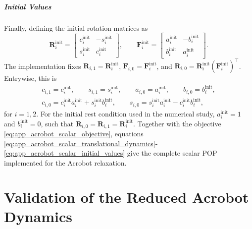 \paragraph{Initial Values}

Finally, defining the initial rotation matrices as
\begin{equation}
\bm{R}_i^{\mathrm{init}}=
\begin{bmatrix}c_i^{\mathrm{init}}&-s_i^{\mathrm{init}}\\
s_i^{\mathrm{init}}&c_i^{\mathrm{init}}\end{bmatrix},
\qquad
\bm{F}_i^{\mathrm{init}}=
\begin{bmatrix}a_i^{\mathrm{init}}&-b_i^{\mathrm{init}}\\
b_i^{\mathrm{init}}&a_i^{\mathrm{init}}\end{bmatrix}.
\label{eq:app_acrobot_initial_matrices}
\end{equation}
The implementation fixes \(\bm{R}_{i,1}=\bm{R}_i^{\mathrm{init}}\),
\(\bm{F}_{i,0}=\bm{F}_i^{\mathrm{init}}\), and
\(\bm{R}_{i,0}=\bm{R}_i^{\mathrm{init}}(\bm{F}_i^{\mathrm{init}})^{\top}\). Entrywise, this is
\begin{subequations}
\label{eq:app_acrobot_scalar_initial_values}
\begin{align}
c_{i,1}=c_i^{\mathrm{init}},\qquad
s_{i,1}=s_i^{\mathrm{init}},\qquad
a_{i,0}=a_i^{\mathrm{init}},\qquad
b_{i,0}=b_i^{\mathrm{init}},
\label{eq:app_acrobot_fixed_R1_F0}\\
c_{i,0}=c_i^{\mathrm{init}}a_i^{\mathrm{init}}
+s_i^{\mathrm{init}}b_i^{\mathrm{init}},\qquad
s_{i,0}=s_i^{\mathrm{init}}a_i^{\mathrm{init}}
          -c_i^{\mathrm{init}}b_i^{\mathrm{init}},
\label{eq:app_acrobot_reconstructed_R0}
\end{align}
\end{subequations}
for $i=1,2$. For the initial rest condition used in the numerical study,
$a_i^{\mathrm{init}}=1$ and $b_i^{\mathrm{init}}=0$, such that
\(\bm{R}_{i,0}=\bm{R}_{i,1}=\bm{R}_i^{\mathrm{init}}\). Together with the objective
\eqref{eq:app_acrobot_scalar_objective}, equations
\eqref{eq:app_acrobot_scalar_translational_dynamics}-
\eqref{eq:app_acrobot_scalar_initial_values} give the complete scalar POP
implemented for the Acrobot relaxation.

\chapter{Validation of the Reduced Acrobot Dynamics}
\label{appendix:experimental_details}

